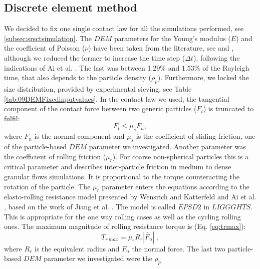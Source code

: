 \documentclass[review]{elsarticle}
\begin{document}
\subsection{Discrete element method}
\label{subsec:dem}

We decided to fix one single
contact law for all the simulations performed, see
\ref{subsec:srsctsimulation}.
The $DEM$ parameters for the Young's modulus ($E$) and the coefficient of Poisson ($\nu$) 
have been taken from the literature, see \cite{RefWorks:175} and \cite{RefWorks:176}, 
although we reduced the former to increase the time step ($\Delta t$), following
the indications of Ai et al. \cite{RefWorks:131}.
The last was between $1.29 \%$ and $1.53 \%$ of the Rayleigh time, that also
depends to the particle density ($\rho_p$).
Furthermore, we locked the size distribution, provided by experimental sieving,
see Table \ref{tab:09DEMFixedinputvalues}.
In the contact law we used, 
the tangential component of the contact force between two generic particles
($F_t$) is truncated to fulfil:
\begin{equation}
F_{t} \leq \mu_s F_{n},
 \label{eq:force_t}
\end{equation}
where $F_n$ is the normal component and $\mu_s$ is the coefficient of sliding
friction, one of the particle-based $DEM$ parameter we investigated. 
Another parameter was the coefficient of rolling friction ($\mu_r$). 
For coarse non-spherical particles this is a critical parameter and describes
inter-particle friction in medium to dense granular flows simulations. It is proportional to the 
torque counteracting the rotation of the particle. The $\mu_r$ parameter enters the 
equations according to the elasto-rolling resistance model presented by Wensrich and 
Katterfeld \cite{RefWorks:87} and Ai et al. \cite{RefWorks:131}, 
based on the work of Jiang et al. \cite{RefWorks:143}. 
The model is called $EPSD2$ in $LIGGGHTS$. This is appropriate for the one way
rolling cases as well as the cycling rolling ones.
The maximum magnitude of rolling resistance torque is (Eq. \ref{eq:trmax}):
\begin{equation}
T_{r~max} = \mu_r R_r |\tilde{F_n}| ~,
 \label{eq:trmax}
\end{equation}
where $R_r$ is the equivalent radius and $F_n$ the normal force.
The last two particle-based $DEM$ parameter we investigated were the $\rho_p$
\end{document}

